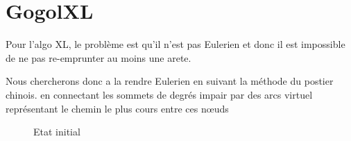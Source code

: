 \documentclass[a4paper, 11pt]{article}
\begin{document}
\section*{GogolXL}
Pour l'algo XL, le problème est qu'il n'est pas Eulerien et donc il est impossible de ne pas re-emprunter au moins une arete.

Nous chercherons donc a la rendre Eulerien en suivant la méthode du postier chinois. en connectant les sommets de degrés impair par des arcs virtuel représentant le chemin le plus cours entre ces nœuds

\begin{figure}[h!]
  \centering
  \qquad
  \caption{Etat initial}%
  \label{fig:example}%
\end{figure}
\end{document}
